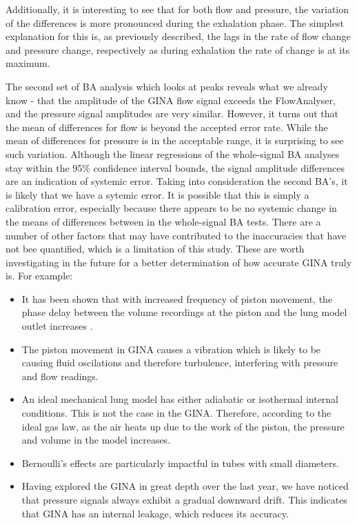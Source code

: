 \documentclass[12pt, openany, oneside]{book}
\begin{document}
Additionally, it is interesting to see that for both flow and pressure, the variation of the differences is more pronounced during the exhalation phase. The simplest explanation for this is, as previously described, the lags in the rate of flow change and pressure change, respectively as during exhalation the rate of change is at its maximum.

The second set of BA analysis which looks at peaks reveals what we already know - that the amplitude of the GINA flow signal exceeds the FlowAnalyser, and the pressure signal amplitudes are very similar. However, it turns out that the mean of differences for flow is beyond the accepted error rate. While the mean of differences for pressure is in the acceptable range, it is surprising to see such variation. Although the linear regressions of the whole-signal BA analyses stay within the 95{\%} confidence interval bounds, the signal amplitude differences are an indication of systemic error. Taking into consideration the second BA's, it is likely that we have a sytemic error. It is possible that this is simply a calibration error, especially because there appears to be no systemic change in the means of differences between in the whole-signal BA tests. There are a number of other factors that may have contributed to the inaccuracies that have not bee quantified, which is a limitation of this study. These are worth investigating in the future for a better determination of how accurate GINA truly is. For example:
\begin{itemize}
\item It has been shown that with increased frequency of piston movement, the phase delay between the volume recordings at the piston and the lung model outlet increases \citep{frey2001}. 
\item The piston movement in GINA causes a vibration which is likely to be causing fluid oscilations and therefore turbulence, interfering with pressure and flow readings.
\item An ideal mechanical lung model has either adiabatic or isothermal internal conditions. This is not the case in the GINA. Therefore, according to the ideal gas law, as the air heats up due to the work of the piston, the pressure and volume in the model increases.
\item Bernoulli's effects are particularly impactful in tubes with small diameters.
\item Having explored the GINA in great depth over the last year, we have noticed that pressure signals always exhibit a gradual downward drift. This indicates that GINA has an internal leakage, which reduces its accuracy.
\end{itemize}
\end{document}
